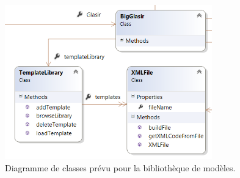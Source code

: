 		\begin{figure}
            \centering
                \includegraphics[width=0.8\textwidth]{figure/library.png}
            \caption{Diagramme de classes prévu pour la bibliothèque de modèles.}
            \label{fig:library}
        \end{figure}